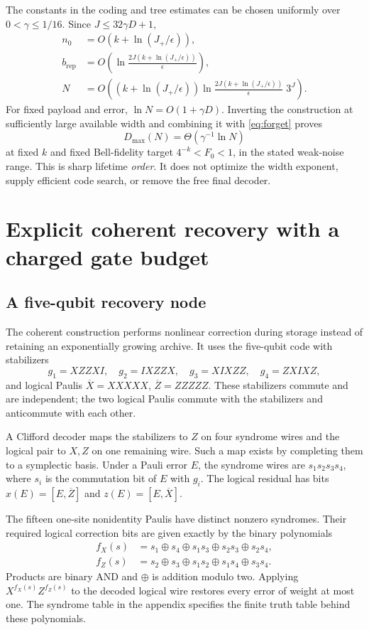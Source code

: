 \documentclass[11pt,a4paper]{article}
\numberwithin{equation}{section}
\theoremstyle{remark}\newtheorem*{remark}{Interpretation}
\newcommand{\eps}{\epsilon}
\newcommand{\xor}{\oplus}
\begin{document}
The constants in the coding and tree estimates can be chosen uniformly over $0<\gamma\le1/16$. Since $J\le32\gamma D+1$,
\begin{align}
n_0&=O(k+\ln(J_+/\eps)),\\
b_{\mathrm{rep}}&=O\!\left(\ln\frac{2J(k+\ln(J_+/\eps))}\eps\right),\\
N&=O\!\left((k+\ln(J_+/\eps))
\ln\frac{2J(k+\ln(J_+/\eps))}\eps\;3^J\right).
\end{align}
For fixed payload and error, $\ln N=O(1+\gamma D)$. Inverting the construction at sufficiently large available width and combining it with \eqref{eq:forget} proves
\begin{equation}
\boxed{D_{\max}(N)=\Theta(\gamma^{-1}\ln N)}
\end{equation}
at fixed $k$ and fixed Bell-fidelity target $4^{-k}<F_0<1$, in the stated weak-noise range. This is sharp lifetime \emph{order}. It does not optimize the width exponent, supply efficient code search, or remove the free final decoder.

\section{Explicit coherent recovery with a charged gate budget}
\subsection{A five-qubit recovery node}
The coherent construction performs nonlinear correction during storage instead of retaining an exponentially growing archive. It uses the five-qubit code with stabilizers
\begin{equation}
g_1=XZZXI,\quad g_2=IXZZX,\quad
g_3=XIXZZ,\quad g_4=ZXIXZ,
\end{equation}
and logical Paulis $\overline X=XXXXX$, $\overline Z=ZZZZZ$. These stabilizers commute and are independent; the two logical Paulis commute with the stabilizers and anticommute with each other.

A Clifford decoder maps the stabilizers to $Z$ on four syndrome wires and the logical pair to $X,Z$ on one remaining wire. Such a map exists by completing them to a symplectic basis. Under a Pauli error $E$, the syndrome wires are $s_1s_2s_3s_4$, where $s_i$ is the commutation bit of $E$ with $g_i$. The logical residual has bits $x(E)=[E,\overline Z]$ and $z(E)=[E,\overline X]$.

The fifteen one-site nonidentity Paulis have distinct nonzero syndromes. Their required logical correction bits are given exactly by the binary polynomials
\begin{align}
f_X(s)&=s_1\xor s_4\xor s_1s_3\xor s_2s_3\xor s_2s_4,\\
f_Z(s)&=s_2\xor s_3\xor s_1s_2\xor s_1s_4\xor s_3s_4.
\label{eq:polynomials}
\end{align}
Products are binary AND and $\xor$ is addition modulo two. Applying $X^{f_X(s)}Z^{f_Z(s)}$ to the decoded logical wire restores every error of weight at most one. The syndrome table in the appendix specifies the finite truth table behind these polynomials.
\end{document}
